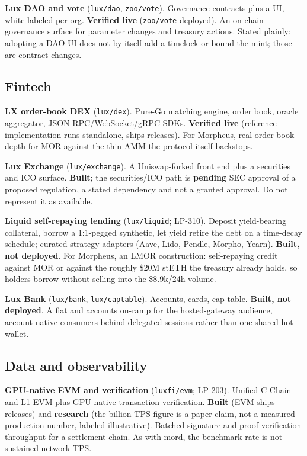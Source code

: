 \documentclass[11pt,a4paper]{article}
\newcommand{\code}[1]{\texttt{\small #1}}
\newcommand{\prov}[1]{{\color{muted}\footnotesize\sffamily[#1]}}
\begin{document}
\textbf{Lux DAO and vote} (\code{lux/dao}, \code{zoo/vote}). Governance contracts plus a UI,
white-labeled per org. \textbf{Verified live} (\code{zoo/vote} deployed). An on-chain governance
surface for parameter changes and treasury actions. Stated plainly: adopting a DAO UI does not
by itself add a timelock or bound the mint; those are contract changes.

\subsection{Fintech}

\textbf{LX order-book DEX} (\code{lux/dex}). Pure-Go matching engine, order book, oracle
aggregator, JSON-RPC/WebSocket/gRPC SDKs. \textbf{Verified live} (reference implementation runs
standalone, ships releases). For Morpheus, real order-book depth for MOR against the thin AMM
the protocol itself backstops.

\textbf{Lux Exchange} (\code{lux/exchange}). A Uniswap-forked front end plus a securities and
ICO surface. \textbf{Built}; the securities/ICO path is \textbf{pending} SEC approval of a
proposed regulation, a stated dependency and not a granted approval. Do not represent it as
available.

\textbf{Liquid self-repaying lending} (\code{lux/liquid}; LP-310). Deposit yield-bearing
collateral, borrow a 1:1-pegged synthetic, let yield retire the debt on a time-decay schedule;
curated strategy adapters (Aave, Lido, Pendle, Morpho, Yearn). \textbf{Built, not deployed}. For
Morpheus, an LMOR construction: self-repaying credit against MOR or against the roughly \$20M
stETH \prov{verified} the treasury already holds, so holders borrow without selling into the
\$8.9k/24h \prov{verified} volume.

\textbf{Lux Bank} (\code{lux/bank}, \code{lux/captable}). Accounts, cards, cap-table.
\textbf{Built, not deployed}. A fiat and accounts on-ramp for the hosted-gateway audience,
account-native consumers behind delegated sessions rather than one shared hot wallet.

\subsection{Data and observability}

\textbf{GPU-native EVM and verification} (\code{luxfi/evm}; LP-203). Unified C-Chain and L1 EVM
plus GPU-native transaction verification. \textbf{Built} (EVM ships releases) and
\textbf{research} (the billion-TPS figure is a paper claim, not a measured production number,
labeled illustrative). Batched signature and proof verification throughput for a settlement
chain. As with mord, the benchmark rate is not sustained network TPS.
\end{document}
